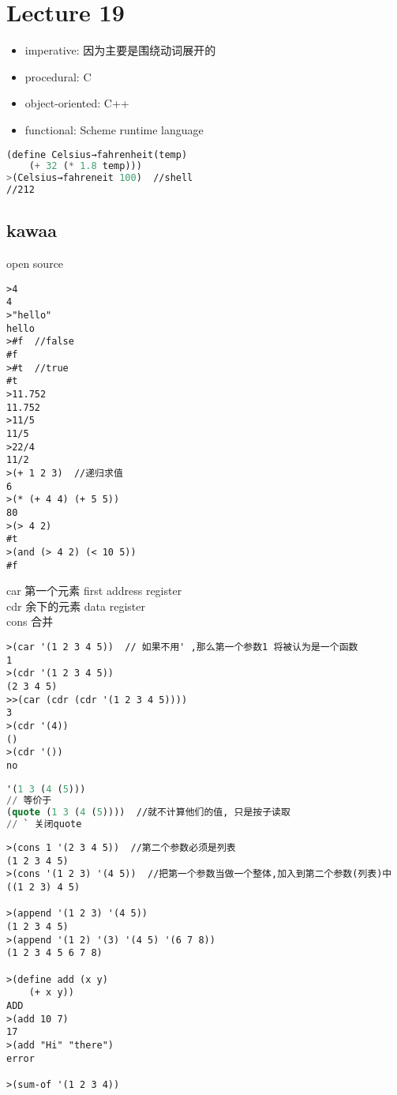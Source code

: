 \documentclass{article}
\begin{document}
\section{Lecture 19}
\begin{itemize}
\item imperative: 因为主要是围绕动词展开的
\item procedural: C
\item object-oriented: C++
\item functional: Scheme runtime language
\end{itemize}

\begin{lstlisting}[language = Lisp]
(define Celsius→fahrenheit(temp)
	(+ 32 (* 1.8 temp)))
>(Celsius→fahreneit 100)  //shell
//212
\end{lstlisting}

\subsection{kawaa}
open source
\begin{verbatim}
>4
4
>"hello"
hello
>#f  //false
#f
>#t  //true
#t
>11.752
11.752
>11/5
11/5
>22/4
11/2
>(+ 1 2 3)  //递归求值
6
>(* (+ 4 4) (+ 5 5))
80
>(> 4 2)
#t
>(and (> 4 2) (< 10 5))
#f
\end{verbatim}

\bigskip\noindent
car 第一个元素 first  address register\\
cdr 余下的元素  data register\\
cons 合并\\
\begin{verbatim}
>(car '(1 2 3 4 5))  // 如果不用' ,那么第一个参数1 将被认为是一个函数
1
>(cdr '(1 2 3 4 5))
(2 3 4 5)
>>(car (cdr (cdr '(1 2 3 4 5))))
3
>(cdr '(4))
()
>(cdr '())
no
\end{verbatim}

\begin{lstlisting}[language = Lisp]
'(1 3 (4 (5)))
// 等价于
(quote (1 3 (4 (5))))  //就不计算他们的值, 只是按子读取
// ` 关闭quote
\end{lstlisting}

\begin{verbatim}
>(cons 1 '(2 3 4 5))  //第二个参数必须是列表
(1 2 3 4 5)
>(cons '(1 2 3) '(4 5))  //把第一个参数当做一个整体,加入到第二个参数(列表)中
((1 2 3) 4 5)

>(append '(1 2 3) '(4 5))
(1 2 3 4 5)
>(append '(1 2) '(3) '(4 5) '(6 7 8))
(1 2 3 4 5 6 7 8)

>(define add (x y)
	(+ x y))
ADD
>(add 10 7)
17
>(add "Hi" "there")
error

>(sum-of '(1 2 3 4))
\end{verbatim}
\end{document}
